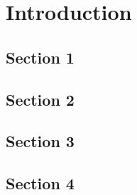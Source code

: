 


\chapter{Introduction}  
\label{chapter 1}
\ifpdf
    \graphicspath{{Chapter1/Figs/}{Chapter1/Figs/PDF/}{Chapter1/Figs/}}
\else
    \graphicspath{{Chapter1/Figs/Vector/}{Chapter1/Figs/}}
\fi



\section{Section 1} %
\label{section 1.1} %






\section{Section 2}  
\label{section1.2}



\section{Section 3}
\label{section 1.3}




\section{Section 4}
\label{section 1.4}

